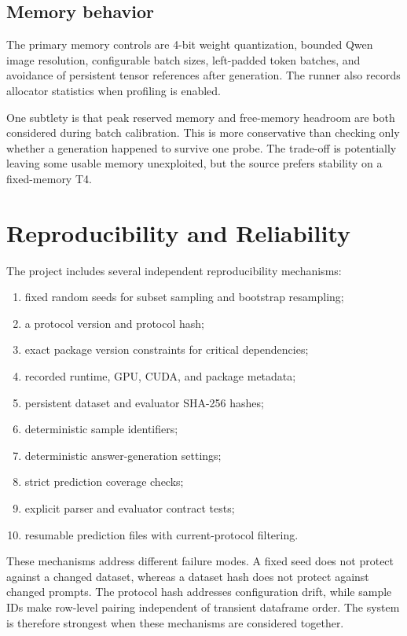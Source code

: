 \documentclass[11pt,a4paper]{article}
\begin{document}
\subsection{Memory behavior}
The primary memory controls are 4-bit weight quantization, bounded Qwen image resolution, configurable batch sizes, left-padded token batches, and avoidance of persistent tensor references after generation. The runner also records allocator statistics when profiling is enabled.

One subtlety is that peak reserved memory and free-memory headroom are both considered during batch calibration. This is more conservative than checking only whether a generation happened to survive one probe. The trade-off is potentially leaving some usable memory unexploited, but the source prefers stability on a fixed-memory T4.

\section{Reproducibility and Reliability}
The project includes several independent reproducibility mechanisms:
\begin{enumerate}
\item fixed random seeds for subset sampling and bootstrap resampling;
\item a protocol version and protocol hash;
\item exact package version constraints for critical dependencies;
\item recorded runtime, GPU, CUDA, and package metadata;
\item persistent dataset and evaluator SHA-256 hashes;
\item deterministic sample identifiers;
\item deterministic answer-generation settings;
\item strict prediction coverage checks;
\item explicit parser and evaluator contract tests;
\item resumable prediction files with current-protocol filtering.
\end{enumerate}

These mechanisms address different failure modes. A fixed seed does not protect against a changed dataset, whereas a dataset hash does not protect against changed prompts. The protocol hash addresses configuration drift, while sample IDs make row-level pairing independent of transient dataframe order. The system is therefore strongest when these mechanisms are considered together.
\end{document}

